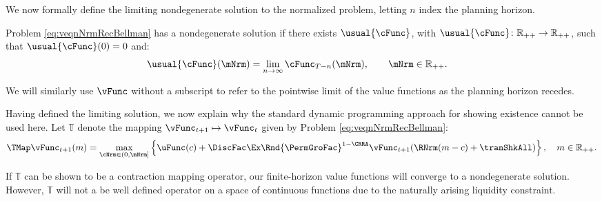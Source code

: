 \documentclass[BufferStockTheory]{subfiles}
\begin{document}

\hypertarget{sensible}{}\hypertarget{useful}{}
\hypertarget{Definition-of-a-Nondegenerate-Solution and Bellman}{}
We now formally define the limiting nondegenerate solution to the normalized problem, letting $n$ index the planning horizon. 
\begin{definition}\label{def:nondegeneracy}
Problem \ref{eq:veqnNrmRecBellman} has a nondegenerate solution if there exists $ \usual{\cFunc}$, with $\usual{\cFunc}\colon \mathbb{R}_{++}\rightarrow \mathbb{R}_{++}$, such that $\usual{\cFunc}(0) = 0$ and:
%
\begin{align*}
  \usual{\cFunc}(\mNrm)  & =  \lim_{n \rightarrow \infty} \cFunc_{T-n}(\mNrm), \qquad \mNrm \in \mathbb{R}_{++} \notag.
\end{align*}
\end{definition}

We will similarly use $\vFunc$ without a subscript to refer to the pointwise limit of the value functions as the planning horizon recedes. 

\hypertarget{Stationary-Bellman-Operator}{}

Having defined the limiting solution, we now explain why the standard dynamic programming approach for showing existence cannot be used here. Let $\mathbb{T}$ denote the mapping $\vFunc_{t+1}\mapsto \vFunc_{t}$ given by Problem \ref{eq:veqnNrmRecBellman}:
%
%
\begin{equation}\label{eq:maintmap}
  \TMap \vFunc_{t+1}(m) = \max_{\cNrm \in (0, \mNrm] }  \left\{
    \uFunc(c) + \DiscFac\Ex\Rnd{\PermGroFac}^{1-\CRRA}\vFunc_{t+1}(\RNrm(m - c) + \tranShkAll)
  \right\}, \quad m\in \mathbb{R}_{++}.  
\end{equation}

If $\mathbb{T}$  can be shown to be a contraction mapping operator, our finite-horizon value functions will converge to a nondegenerate solution. However, $\mathbb{T}$ will not a be well defined operator on a space of continuous functions due to the naturally arising liquidity constraint. 
\end{document}
